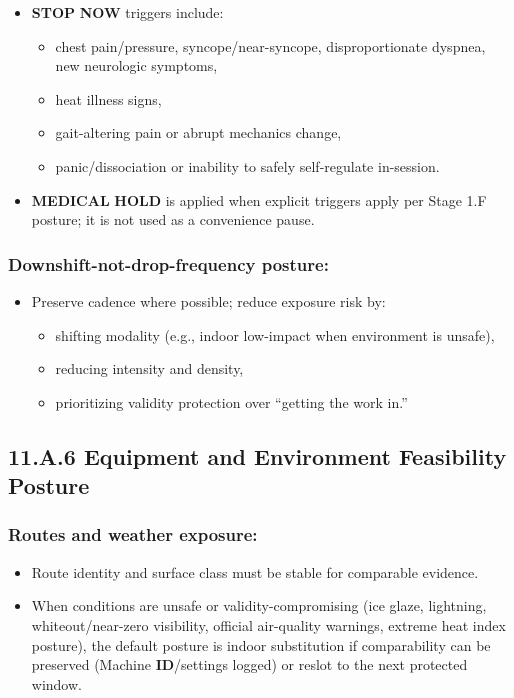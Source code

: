 \documentclass[10pt]{article}
\begin{document}
\begin{itemize}
\item \textbf{STOP} \textbf{NOW} triggers include:
  \begin{itemize}
  \item chest pain/pressure, syncope/near-syncope, disproportionate dyspnea, new neurologic symptoms,
  \item heat illness signs,
  \item gait-altering pain or abrupt mechanics change,
  \item panic/dissociation or inability to safely self-regulate in-session.
  \end{itemize}
\item \textbf{MEDICAL} \textbf{HOLD} is applied when explicit triggers apply per Stage 1.F posture; it is not used as a convenience pause.
\end{itemize}

\subsubsection*{Downshift-not-drop-frequency posture:}

\begin{itemize}
\item Preserve cadence where possible; reduce exposure risk by:
  \begin{itemize}
  \item shifting modality (e.g., indoor low-impact when environment is unsafe),
  \item reducing intensity and density,
  \item prioritizing validity protection over “getting the work in.”
  \end{itemize}
\end{itemize}

\newpage

\subsection*{11.A.6 Equipment and Environment Feasibility Posture}
{}

\subsubsection*{Routes and weather exposure:}

\begin{itemize}
\item Route identity and surface class must be stable for comparable evidence.
\item When conditions are unsafe or validity-compromising (ice glaze, lightning, whiteout/near-zero visibility, official air-quality warnings, extreme heat index posture), the default posture is indoor substitution if comparability can be preserved (Machine \textbf{ID}/settings logged) or reslot to the next protected window.
\end{itemize}
\end{document}
